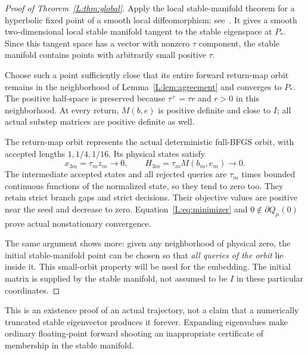 \begin{proof}[Proof of Theorem~\ref{L:thm:global}]
Apply the local stable-manifold theorem for a hyperbolic fixed point of a smooth local diffeomorphism; see~\cite[Sections 3--4]{DY}. It gives a smooth two-dimensional local stable manifold tangent to the stable eigenspace at $P_*$. Since this tangent space has a vector with nonzero $\tau$ component, the stable manifold contains points with arbitrarily small positive $\tau$.

Choose such a point sufficiently close that its entire forward return-map orbit remains in the neighborhood of Lemma~\ref{L:lem:agreement} and converges to $P_*$. The positive half-space is preserved because $\tau^+=\tau r$ and $r>0$ in this neighborhood. At every return, $M(b,e)$ is positive definite and close to $I$; all actual substep matrices are positive definite as well.

The return-map orbit represents the actual deterministic full-BFGS orbit, with accepted lengths $1,1/4,1/16$. Its physical states satisfy
\[
 x_{3m}=\tau_m z_m\to0,\qquad H_{3m}=\tau_mM(b_m,e_m)\to0.
\]
The intermediate accepted states and all rejected queries are $\tau_m$ times bounded continuous functions of the normalized state, so they tend to zero too. They retain strict branch gaps and strict decisions. Their objective values are positive near the seed and decrease to zero. Equation~\eqref{L:eq:minimizer} and $0\notin\partial Q_\mu(0)$ prove actual nonstationary convergence.

The same argument shows more: given any neighborhood of physical zero, the initial stable-manifold point can be chosen so that \emph{all queries of the orbit} lie inside it. This small-orbit property will be used for the embedding. The initial matrix is supplied by the stable manifold, not assumed to be $I$ in these particular coordinates.
\end{proof}
\noindent This is an existence proof of an actual trajectory, not a claim that a numerically truncated stable eigenvector produces it forever. Expanding eigenvalues make ordinary floating-point forward shooting an inappropriate certificate of membership in the stable manifold.


\setcounter{section}{4}
\setcounter{theorem}{2}
\setcounter{lemma}{1}
\setcounter{corollary}{0}
\setcounter{proposition}{0}
\setcounter{remark}{0}
\setcounter{equation}{4}
